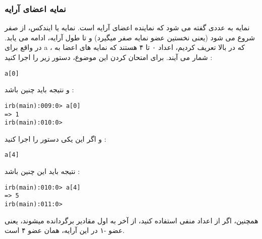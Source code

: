 \documentclass[11pt]{article}
\begin{document}
\subsubsection{نمایه اعضای آرایه}
نمایه
به عددی گفته می شود که نماینده اعضای آرایه است. نمایه یا ایندکس، از صفر شروع می شود (یعنی نخستین عضو نمایه صفر میگیرد) و تا طول آرایه، ادامه می یابد. در واقع برای a ، که در بالا تعریف کردیم، اعداد ۰ تا ۴ هستند که نمایه های اعضا به شمار می آیند. برای امتحان کردن این موضوع، دستور زیر را اجرا کنید :
\begin{latin}
\begin{verbatim}
a[0]
\end{verbatim}
\end{latin}
و نتیجه باید چنین باشد :
\begin{latin}
\begin{verbatim}
irb(main):009:0> a[0]
=> 1
irb(main):010:0>
\end{verbatim}
\end{latin}
و اگر این یکی دستور را اجرا کنید :
\begin{latin}
\begin{verbatim}
a[4]
\end{verbatim}
\end{latin}
نتیجه باید این چنین باشد :
\begin{latin}
\begin{verbatim}
irb(main):010:0> a[4]
=> 5
irb(main):011:0> 
\end{verbatim}
\end{latin}
همچنین، اگر از اعداد منفی استفاده کنید، از آخر به اول مقادیر برگردانده میشوند، یعنی عضو -۱ در این آرایه، همان عضو ۴ است. 
\end{document}
